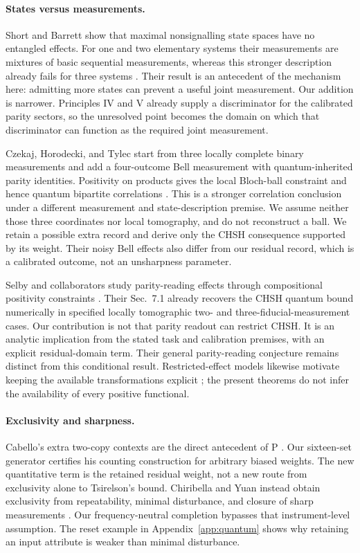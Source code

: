 \documentclass[a4paper,11pt,twocolumn,unpublished]{quantumarticle}
\begin{document}
\paragraph{States versus measurements.}
Short and Barrett show that maximal nonsignalling state spaces have no entangled effects. For one and two elementary systems their measurements are mixtures of basic sequential measurements, whereas this stronger description already fails for three systems \cite[Sec.~IV, Corollary 1, Theorems 2--4]{short}. Their result is an antecedent of the mechanism here: admitting more states can prevent a useful joint measurement. Our addition is narrower. Principles IV and V already supply a discriminator for the calibrated parity sectors, so the unresolved point becomes the domain on which that discriminator can function as the required joint measurement.

Czekaj, Horodecki, and Tylec start from three locally complete binary measurements and add a four-outcome Bell measurement with quantum-inherited parity identities. Positivity on products gives the local Bloch-ball constraint and hence quantum bipartite correlations \cite[Secs.~II--III, Eqs.~(4), (9)]{czekaj}. This is a stronger correlation conclusion under a different measurement and state-description premise. We assume neither those three coordinates nor local tomography, and do not reconstruct a ball. We retain a possible extra record and derive only the CHSH consequence supported by its weight. Their noisy Bell effects also differ from our residual record, which is a calibrated outcome, not an unsharpness parameter.

Selby and collaborators study parity-reading effects through compositional positivity constraints \cite[Secs.~3, 5, 7--8]{selby}. Their Sec.~7.1 already recovers the CHSH quantum bound numerically in specified locally tomographic two- and three-fiducial-measurement cases. Our contribution is not that parity readout can restrict CHSH. It is an analytic implication from the stated task and calibration premises, with an explicit residual-domain term. Their general parity-reading conjecture remains distinct from this conditional result. Restricted-effect models likewise motivate keeping the available transformations explicit \cite{restricted}; the present theorems do not infer the availability of every positive functional.

\paragraph{Exclusivity and sharpness.}
Cabello's extra two-copy contexts are the direct antecedent of P \cite[step III and Eq.~(10)]{cabello}. Our sixteen-set generator certifies his counting construction for arbitrary biased weights. The new quantitative term is the retained residual weight, not a new route from exclusivity alone to Tsirelson's bound. Chiribella and Yuan instead obtain exclusivity from repeatability, minimal disturbance, and closure of sharp measurements \cite[Principles 1--3 and Methods]{sharp}. Our frequency-neutral completion bypasses that instrument-level assumption. The reset example in Appendix~\ref{app:quantum} shows why retaining an input attribute is weaker than minimal disturbance.
\end{document}

